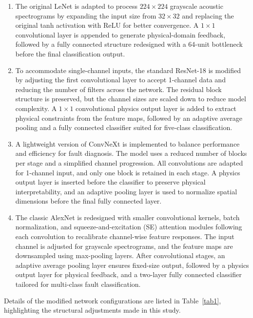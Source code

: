 \documentclass[final,5p,times,twocolumn]{elsarticle}
\begin{document}
\begin{enumerate}
	\item{The original LeNet is adapted to process \({224\times224}\) grayscale acoustic spectrograms by expanding the input size from \({32\times32}\) and replacing the original tanh activation with ReLU for better convergence. A \(1\times 1\) convolutional layer is appended to generate physical-domain feedback, followed by a fully connected structure redesigned with a 64-unit bottleneck before the final classification output.}
	
	\item{To accommodate single-channel inputs, the standard ResNet-18 is modified by adjusting the first convolutional layer to accept 1-channel data and reducing the number of filters across the network. The residual block structure is preserved, but the channel sizes are scaled down to reduce model complexity. A \(1\times 1\) convolutional physics output layer is added to extract physical constraints from the feature maps, followed by an adaptive average pooling and a fully connected classifier suited for five-class classification.}
	
	\item{A lightweight version of ConvNeXt is implemented to balance performance and efficiency for fault diagnosis. The model uses a reduced number of blocks per stage and a simplified channel progression. All convolutions are adapted for 1-channel input, and only one block is retained in each stage. A physics output layer is inserted before the classifier to preserve physical interpretability, and an adaptive pooling layer is used to normalize spatial dimensions before the final fully connected layer.}
	
	\item{The classic AlexNet is redesigned with smaller convolutional kernels, batch normalization, and squeeze-and-excitation (SE) attention modules following each convolution to recalibrate channel-wise feature responses. The input channel is adjusted for grayscale spectrograms, and the feature maps are downsampled using max-pooling layers. After convolutional stages, an adaptive average pooling layer ensures fixed-size output, followed by a physics output layer for physical feedback, and a two-layer fully connected classifier tailored for multi-class fault classification.}
\end{enumerate}

Details of the modified network configurations are listed in Table~\ref{tab1}, highlighting the structural adjustments made in this study.
\end{document}
